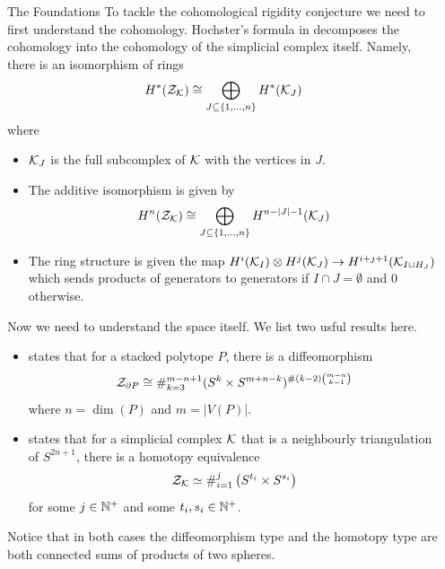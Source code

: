 \documentclass[final]{beamer}
\begin{document}
\begin{frame}[t]
\begin{columns}[t]
\begin{column}{\colwidth}
  \begin{block}{The Foundations}
To tackle the cohomological rigidity conjecture we need to first understand the cohomology. Hochster's formula in \cite{ToricTopology} decomposes the cohomology into the cohomology of the simplicial complex itself. Namely, there is an isomorphism of rings $$H^\ast(\mathcal{Z}_{\mathcal{K}})\cong\bigoplus_{J\subseteq\{1,\dots,n\}}H^\ast(\mathcal{K}_J)$$ where 
\begin{itemize}
\item $\mathcal{K}_J$ is the full subcomplex of $\mathcal{K}$ with the vertices in $J$. 
\item The additive isomorphism is given by $$H^n(\mathcal{Z}_{\mathcal{K}})\cong\bigoplus_{J\subseteq\{1,\dots,n\}}H^{n-\lvert J\rvert-1}(\mathcal{K}_J)$$
\item The ring structure is given the map $H^i(\mathcal{K}_I)\otimes H^j(\mathcal{K}_J)\to H^{i+j+1}(\mathcal{K}_{I\cup H_J})$ which sends products of generators to generators if $I\cap J=\emptyset$ and $0$ otherwise. 
\end{itemize}
Now we need to understand the space itself. We list two usful results here. 
\begin{itemize}
\item \cite{Mcgraven} states that for a stacked polytope $P$, there is a diffeomorphism $$\mathcal{Z}_{\partial P}\cong\#_{k=3}^{m-n+1}(S^k\times S^{m+n-k})^{\#(k-2)\binom{m-n}{k-1}}$$ where $n=\dim(P)$ and $m=\lvert V(P)\rvert$. 
\item \cite{Amaranta} states that for a simplicial complex $\mathcal{K}$ that is a neighbourly triangulation of $S^{2n+1}$, there is a homotopy equivalence $$\mathcal{Z}_{\mathcal{K}}\simeq\#_{i=1}^j\left(S^{t_i}\times S^{s_i}\right)$$ for some $j\in\mathbb{N}^+$ and some $t_i,s_i\in\mathbb{N}^+$. 
\end{itemize}
Notice that in both cases the diffeomorphism type and the homotopy type are both connected sums of products of two spheres. 
  \end{block}

\end{column}

\separatorcolumn

\begin{column}{\colwidth}


\end{column}
\end{columns}
\end{frame}
\end{document}
